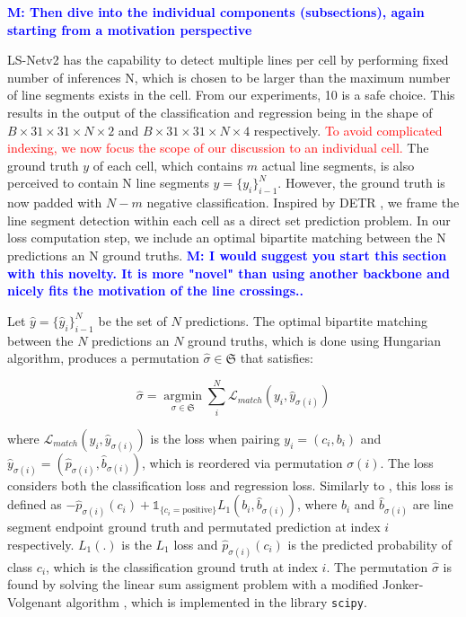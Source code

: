 \documentclass[journal]{IEEEtran}
\newcommand{\commentM}[1]{\textbf{\textcolor{blue}{M: #1}}}
\begin{document}
\commentM{Then dive into the individual components (subsections), again starting from a motivation perspective}

LS-Netv2 has the capability to detect multiple lines per cell by performing fixed number of inferences N, which is chosen to be larger than the maximum number of line segments exists in the cell. From our experiments, 10 is a safe choice. This results in the output of the classification and regression being in the shape of $B \times 31 \times 31 \times N \times 2$ and $B \times 31 \times 31 \times N \times 4$ respectively. \textcolor{red}{To avoid complicated indexing, we now focus the scope of our discussion to an individual cell.} The ground truth $y$ of each cell, which contains $m$ actual line segments, is also perceived to contain N line segments $y=\{y_i\}^N_{i-1}$. However, the ground truth is now padded with $N-m$ negative classification. Inspired by DETR \cite{DETR}, we frame the line segment detection within each cell as a direct set prediction problem. In our loss computation step, we include an optimal bipartite matching between the N predictions an N ground truths. \commentM{I would suggest you start this section with this novelty. It is more "novel" than using another backbone and nicely fits the motivation of the line crossings..}

Let $\hat{y}=\{\hat{y}_i\}^N_{i-1}$ be the set of $N$ predictions. The optimal bipartite matching between the $N$ predictions an $N$ ground truths, which is done using Hungarian algorithm, produces a permutation $\hat{\sigma} \in \mathfrak{S}$ that satisfies:

\begin{equation} \label{bipartite_eqn}
\hat{\sigma} = \mathop{\arg \min}\limits_{\sigma \in \mathfrak{S}} \sum_i^N \mathcal{L}_{match} (y_i, \hat{y}_{\sigma(i)})
\end{equation}

where $\mathcal{L}_{match} (y_i, \hat{y}_{\sigma(i)})$ is the loss when pairing $y_i = (c_i, b_i)$ and $\hat{y}_{\sigma(i)} = (\hat{p}_{\sigma(i)}, \hat{b}_{\sigma(i)})$, which is reordered via permutation $\sigma(i)$. The loss considers both the classification loss and regression loss. Similarly to \cite{DETR}, this loss is defined as $-\hat{p}_{\sigma(i)}(c_i) + \mathds{1}_{\{c_i=\text{positive}\}}L_1(b_i, \hat{b}_{\sigma(i)})$, where $b_i$ and $\hat{b}_{\sigma(i)}$ are line segment endpoint ground truth and permutated prediction at index $i$ respectively. $L_1(.)$ is the $L_1$ loss and $\hat{p}_{\sigma(i)}(c_i)$ is the predicted probability of class $c_i$, which is the classification ground truth at index $i$. The permutation $\hat{\sigma}$ is found by solving the linear sum assigment problem with a modified Jonker-Volgenant algorithm \cite{7738348}, which is implemented in the library \texttt{scipy}.
\end{document}
